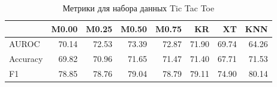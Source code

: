 \begin{table}
\caption{Метрики для набора данных Tic Tac Toe}
\label{tab:Tic Tac Toe}
\begin{tabular}{lrrrrrrr}
\toprule
 & M0.00 & M0.25 & M0.50 & M0.75 & KR & XT & KNN \\
\midrule
AUROC & 70.14 & 72.53 & 73.39 & 72.87 & 71.90 & 69.74 & 64.26 \\
Accuracy & 69.82 & 70.96 & 71.65 & 71.47 & 71.40 & 67.71 & 71.53 \\
F1 & 78.85 & 78.76 & 79.04 & 78.79 & 79.11 & 74.90 & 80.14 \\
\bottomrule
\end{tabular}
\end{table}
